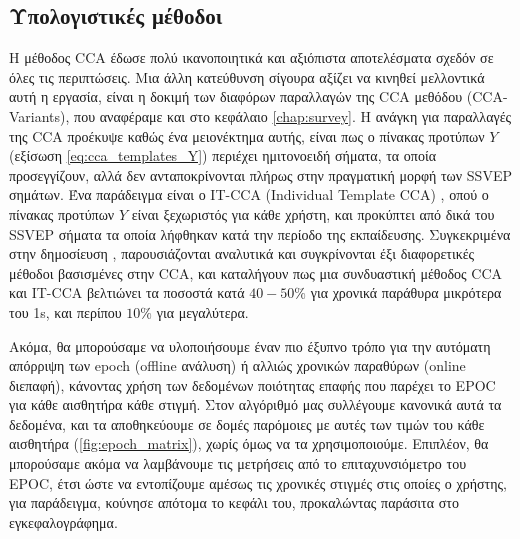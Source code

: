\documentclass[11pt,a4paper,english,greek,twoside]{../Thesis}
\begin{document}
\subsection{Υπολογιστικές μέθοδοι}


\par Η μέθοδος CCA έδωσε πολύ ικανοποιητικά και αξιόπιστα αποτελέσματα σχεδόν σε όλες τις περιπτώσεις. Μια άλλη κατεύθυνση σίγουρα αξίζει να κινηθεί μελλοντικά αυτή η εργασία, είναι η δοκιμή των διαφόρων παραλλαγών της CCA μεθόδου (CCA-Variants), που αναφέραμε και στο κεφάλαιο \ref{chap:survey}. Η ανάγκη για παραλλαγές της CCA προέκυψε καθώς ένα μειονέκτημα αυτής, είναι πως ο πίνακας προτύπων $Y$ (εξίσωση \eqref{eq:cca_templates_Y}) περιέχει ημιτονοειδή σήματα, τα οποία προσεγγίζουν, αλλά δεν ανταποκρίνονται πλήρως στην πραγματική μορφή των SSVEP σημάτων. Ένα παράδειγμα είναι ο IT-CCA (Individual Template CCA) \cite{Bin2011-eh}, οπού ο πίνακας προτύπων $Y$ είναι ξεχωριστός για κάθε χρήστη, και προκύπτει από δικά του SSVEP σήματα τα οποία λήφθηκαν κατά την περίοδο της εκπαίδευσης. Συγκεκριμένα στην δημοσίευση \cite{Nakanishi2015-md}, παρουσιάζονται αναλυτικά και συγκρίνονται έξι διαφορετικές μέθοδοι βασισμένες στην CCA, και καταλήγουν πως μια συνδυαστική μέθοδος CCA και IT-CCA βελτιώνει τα ποσοστά κατά $40-50\%$ για χρονικά παράθυρα μικρότερα του 1s, και περίπου $10\%$ για μεγαλύτερα. 

\par Ακόμα, θα μπορούσαμε να υλοποιήσουμε έναν πιο έξυπνο τρόπο για την αυτόματη απόρριψη των epoch (offline ανάλυση) ή αλλιώς χρονικών παραθύρων (online διεπαφή), κάνοντας χρήση των δεδομένων ποιότητας επαφής που παρέχει το EPOC για κάθε αισθητήρα κάθε στιγμή. Στον αλγόριθμό μας συλλέγουμε κανονικά αυτά τα δεδομένα, και τα αποθηκεύουμε σε δομές παρόμοιες με αυτές των τιμών του κάθε αισθητήρα (\ref{fig:epoch_matrix}), χωρίς όμως να τα χρησιμοποιούμε. Επιπλέον, θα μπορούσαμε ακόμα να λαμβάνουμε τις μετρήσεις από το επιταχυνσιόμετρο του EPOC, έτσι ώστε να εντοπίζουμε αμέσως τις χρονικές στιγμές στις οποίες ο χρήστης, για παράδειγμα, κούνησε απότομα το κεφάλι του, προκαλώντας παράσιτα στο εγκεφαλογράφημα.
\end{document}
